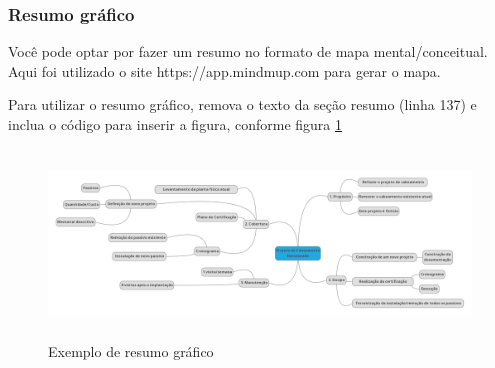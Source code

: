 \documentclass[	DIV=calc,%
							paper=a4,%
							fontsize=12pt,%
							onecolumn]{scrartcl}	 					%
\begin{document}
\subsubsection{Resumo gráfico}

Você pode optar por fazer um resumo no formato de mapa mental/conceitual. 
Aqui foi utilizado o site https://app.mindmup.com para gerar o mapa.

Para utilizar o resumo gráfico, remova o texto da seção resumo (linha 137) e inclua o código para inserir a figura, conforme figura \ref{fig4}

\begin{figure}[h]
	\centering
	\includegraphics[width=\textwidth,height=5cm,keepaspectratio]{fig4}
	\caption{Exemplo de resumo gráfico}
	\label{fig4}	
\end{figure}

\end{document}
